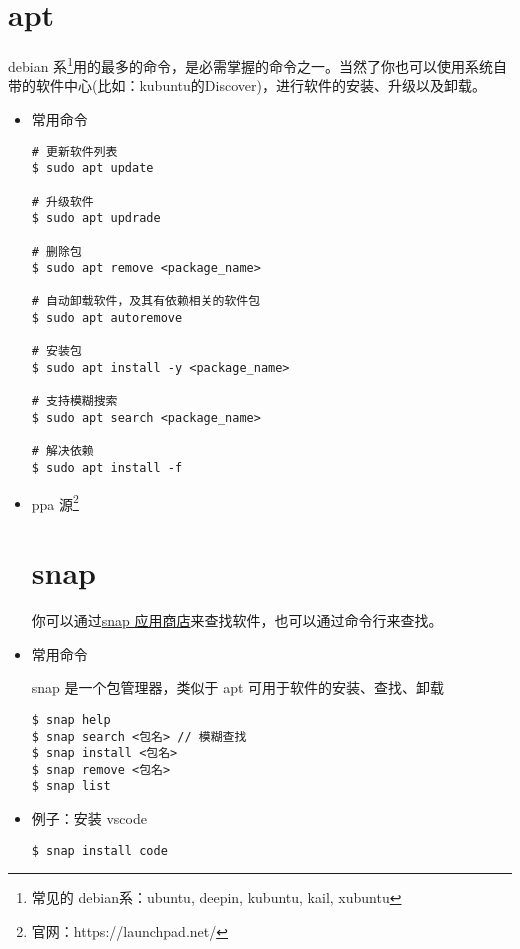\section{apt}
debian 系\footnote{常见的 debian系：ubuntu, deepin, kubuntu, kail, xubuntu}用的最多的命令，是必需掌握的命令之一。当然了你也可以使用系统自带的软件中心(比如：kubuntu的Discover)，进行软件的安装、升级以及卸载。
\begin{itemize}
\item 常用命令
\begin{lstlisting}
# 更新软件列表
$ sudo apt update 

# 升级软件
$ sudo apt updrade 

# 删除包
$ sudo apt remove <package_name>

# 自动卸载软件，及其有依赖相关的软件包
$ sudo apt autoremove 

# 安装包
$ sudo apt install -y <package_name>

# 支持模糊搜索  
$ sudo apt search <package_name> 

# 解决依赖
$ sudo apt install -f
\end{lstlisting}


\item ppa 源\footnote{官网：https://launchpad.net/}
\newpage
	
\section{snap}
你可以通过\href{https://snapcraft.io/}{snap 应用商店}来查找软件，也可以通过命令行来查找。

\item 常用命令

snap 是一个包管理器，类似于 apt 可用于软件的安装、查找、卸载
\begin{lstlisting}
$ snap help 
$ snap search <包名> // 模糊查找
$ snap install <包名>
$ snap remove <包名>
$ snap list 
\end{lstlisting}

\item 例子：安装 vscode 
\begin{lstlisting}
$ snap install code
\end{lstlisting}
\end{itemize}

